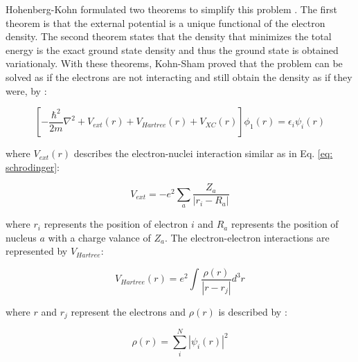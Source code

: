 Hohenberg-Kohn formulated two theorems to simplify this problem \cite{Hohenberg1964}. The first theorem is that the external potential is a unique functional of the electron density. The second theorem states that the density that minimizes the total energy is the exact ground state density and thus the ground state is obtained variationaly. With these theorems, Kohn-Sham proved that the problem can be solved as if the electrons are not interacting and still obtain the density as if they were, by \cite{Kohn1965}:
 
  \begin{equation}
 \label{eq: kohnsham}
\left[ -\frac{\hbar^2}{2m} \nabla^{2} + V_{ext} (r) + V_{Hartree}(r) + V_{XC} (r) \right] \phi_{1}(r) = \epsilon_{i} \psi_{i}(r)
 \end{equation}
 
 \noindent where $V_{ext}(r)$ describes the electron-nuclei interaction similar as in Eq. \ref{eq: schrodinger}:

\begin{equation}
\label{eq: vext}
V_{ext} = - e^2 \sum_{a} \frac {Z_{a}}{|r_i - R_a|}
\end{equation}

\noindent where $r_i$ represents the position of electron $i$ and $R_a$ represents the position of nucleus $a$ with a charge valance of $Z_a$. The electron-electron interactions are represented by $V_{Hartree}$:

\begin{equation}
\label{eq: vhartree}
V_{Hartree} (r) = e^{2} \int \frac {\rho(r)}{|r - r_{j}|} d^3r
\end{equation}

\noindent where $r$ and $r_j$ represent the electrons and $\rho (r)$ is described by :

\begin{equation}
\label{eq: rhop}
\rho (r) = \sum_{i}^N | \psi_{i} (r) |^2
\end{equation}

